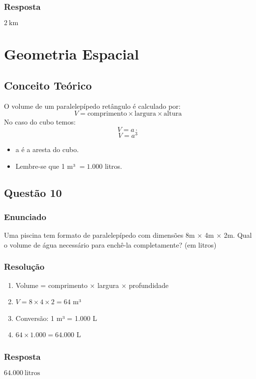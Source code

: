 \documentclass[11pt]{article}
\begin{document}
\subsubsection*{Resposta}
$\boxed{2\ \text{km}}$

\section{Geometria Espacial}

\subsection{Conceito Teórico}
O volume de um paralelepípedo retângulo é calculado por:
\[ V = \text{comprimento} \times \text{largura} \times \text{altura} \]
No caso do cubo temos: 
\[V = a \cdot  \]
\[V = a^{3} \]

\begin{itemize}
    \item a é a aresta do cubo.
    \item  Lembre-se que 1 m³ $ = 1.000$  litros.
\end{itemize}


\subsection{Questão 10}
\subsubsection*{Enunciado}
Uma piscina tem formato de paralelepípedo com dimensões 8m × 4m × 2m. Qual o volume de água necessário para enchê-la completamente? (em litros)

\subsubsection*{Resolução}
\begin{enumerate}
\item Volume = comprimento × largura × profundidade
\item $V = 8 \times 4 \times 2 = 64$ m³
\item Conversão: 1 m³ = 1.000 L
\item $64 \times 1.000 = 64.000$ L
\end{enumerate}

\subsubsection*{Resposta}
$\boxed{64.000\ \text{litros}}$
\end{document}
